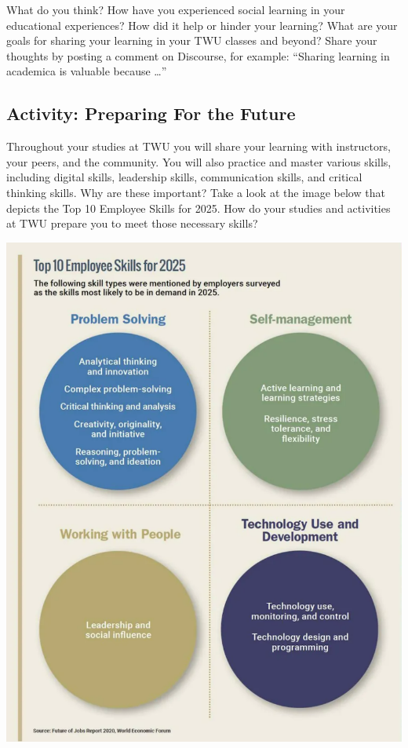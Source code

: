 \documentclass[
]{book}
\theoremstyle{definition}
\theoremstyle{definition}
\theoremstyle{definition}
\theoremstyle{definition}
\theoremstyle{remark}
\begin{document}
\begin{reflect}
What do you think? How have you experienced social learning in your educational experiences? How did it help or hinder your learning? What are your goals for sharing your learning in your TWU classes and beyond? Share your thoughts by posting a comment on Discourse, for example: ``Sharing learning in academica is valuable because \ldots{}''
\end{reflect}

\hypertarget{activity-preparing-for-the-future}{%
\subsection*{Activity: Preparing For the Future}\label{activity-preparing-for-the-future}}

\begin{reflect}
Throughout your studies at TWU you will share your learning with instructors, your peers, and the community. You will also practice and master various skills, including digital skills, leadership skills, communication skills, and critical thinking skills. Why are these important? Take a look at the image below that depicts the Top 10 Employee Skills for 2025. How do your studies and activities at TWU prepare you to meet those necessary skills?

\includegraphics{assets/u6/Top Employee Skills 2025.png}


\end{reflect}
\end{document}
